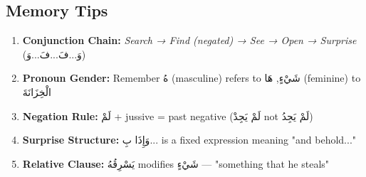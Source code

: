 \documentclass[letterpaper,12pt]{article}
\begin{document}
\subsection{Memory Tips}
\begin{enumerate}
\item \textbf{Conjunction Chain:} \textit{Search → Find (negated) → See → Open → Surprise} (\textarabic{وَ...فَ...فَ...وَ})
\item \textbf{Pronoun Gender:} Remember \textarabic{هُ} (masculine) refers to \textarabic{شَيْءٍ}, \textarabic{هَا} (feminine) to \textarabic{الْخِزَانَةَ}
\item \textbf{Negation Rule:} \textarabic{لَمْ} + jussive = past negative (\textarabic{لَمْ يَجِدْ} not \textarabic{لَمْ يَجِدُ})
\item \textbf{Surprise Structure:} \textarabic{وَإِذَا بِ...} is a fixed expression meaning "and behold..."
\item \textbf{Relative Clause:} \textarabic{يَسْرِقُهُ} modifies \textarabic{شَيْءٍ} — "something that he steals"
\end{enumerate}
\end{document}
